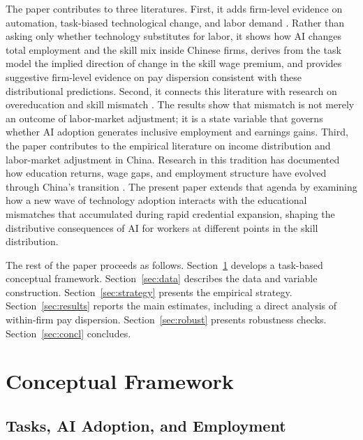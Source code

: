 \documentclass[12pt,a4paper]{article}
\theoremstyle{predstyle}
\theoremstyle{plain}
\begin{document}
The paper contributes to three literatures. First, it adds firm-level evidence on automation, task-biased technological change, and labor demand \citep{autor2003skill, autor2018automation, goos2007lousy, goos2014explaining, acemoglu2018artificial, acemoglu2020robots, acemoglu2022tasks, acemoglu2026automation}. Rather than asking only whether technology substitutes for labor, it shows how AI changes total employment and the skill mix inside Chinese firms, derives from the task model the implied direction of change in the skill wage premium, and provides suggestive firm-level evidence on pay dispersion consistent with these distributional predictions. Second, it connects this literature with research on overeducation and skill mismatch \citep{mcguinness2006overeducation, pellizzari2017new}. The results show that mismatch is not merely an outcome of labor-market adjustment; it is a state variable that governs whether AI adoption generates inclusive employment and earnings gains. Third, the paper contributes to the empirical literature on income distribution and labor-market adjustment in China. Research in this tradition has documented how education returns, wage gaps, and employment structure have evolved through China's transition \citep{knight2003, knight2014}. The present paper extends that agenda by examining how a new wave of technology adoption interacts with the educational mismatches that accumulated during rapid credential expansion, shaping the distributive consequences of AI for workers at different points in the skill distribution.

The rest of the paper proceeds as follows. Section~\ref{sec:framework} develops a task-based conceptual framework. Section~\ref{sec:data} describes the data and variable construction. Section~\ref{sec:strategy} presents the empirical strategy. Section~\ref{sec:results} reports the main estimates, including a direct analysis of within-firm pay dispersion. Section~\ref{sec:robust} presents robustness checks. Section~\ref{sec:concl} concludes.

\section{Conceptual Framework}
\label{sec:framework}

\subsection{Tasks, AI Adoption, and Employment}
\end{document}
